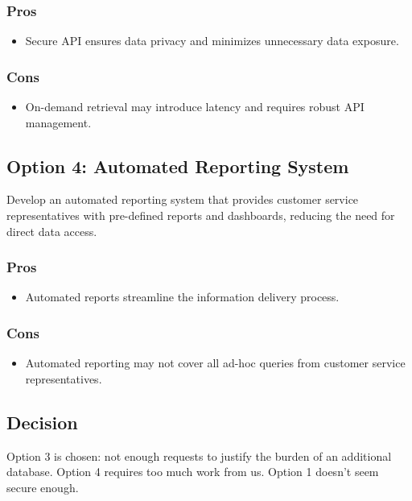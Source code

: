 \subsubsection*{Pros}
\begin{itemize}
    \item Secure API ensures data privacy and minimizes unnecessary data exposure.
\end{itemize}
\subsubsection*{Cons}
\begin{itemize}
    \item On-demand retrieval may introduce latency and requires robust API management.
\end{itemize}

\subsection*{Option 4: Automated Reporting System}
Develop an automated reporting system that provides customer service representatives with pre-defined reports and dashboards, reducing the need for direct data access.
\subsubsection*{Pros}
\begin{itemize}
    \item Automated reports streamline the information delivery process.
\end{itemize}
\subsubsection*{Cons}
\begin{itemize}
    \item Automated reporting may not cover all ad-hoc queries from customer service representatives.
\end{itemize}

\subsection*{Decision}
Option 3 is chosen: not enough requests to justify the burden of an additional database. Option 4 requires too much work from us. Option 1 doesn't seem secure enough.

